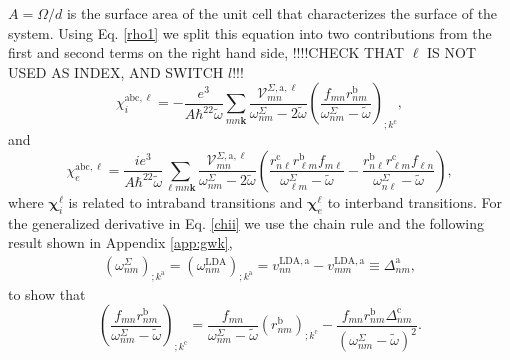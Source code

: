 $A=\Omega/d$ is the surface area of the unit cell that characterizes the surface
of the system. Using Eq. \eqref{rho1} we split this equation into two
contributions from the first and second terms on the right hand side,
{\color{red}!!!!CHECK THAT $\ell$ IS NOT USED AS INDEX, AND SWITCH $l$!!!}
\begin{equation}\label{chii}
\chi^{\mathrm{abc},\ell}_{i}
=-\frac{e^3}{A\hbar^22\tilde{\omega}}\sum_{mn\mathbf{k}}
\frac{\mathcal{V}_{mn}^{\Sigma,\mathrm{a},\ell}}{\omega^\Sigma_{nm}-2\tilde{\omega}}
\left(\frac{f_{mn}r_{nm}^{\mathrm{b}}}{\omega^\Sigma_{nm}-\tilde{\omega}}\right)_{;k^{\mathrm{c}}},
\end{equation} 
and 
\begin{equation}\label{chie}
\chi^{\mathrm{abc},\ell}_{e}
=\frac{ie^3}{A\hbar^22\tilde{\omega}}\sum_{\ell mn\mathbf{k}}
\frac{\mathcal{V}_{mn}^{\Sigma,\mathrm{a},\ell}}{\omega^\Sigma_{nm}-2\tilde{\omega}}
\left(
\frac{r_{n\ell}^{\mathrm{c}} r_{\ell m}^{\mathrm{b}} 
f_{m\ell}}{\omega^\Sigma_{\ell m}-\tilde{\omega}}
-\frac{r_{n\ell}^{\mathrm{b}} r_{\ell m}^{\mathrm{c}} 
f_{\ell n}}{\omega^\Sigma_{n \ell}-\tilde{\omega}}
\right),
\end{equation} 
where $\boldsymbol{\chi}^{\ell}_{i}$ is related to intraband transitions and
 $\boldsymbol{\chi}^{\ell}_{e}$ to interband transitions. For the generalized
 derivative in Eq. \eqref{chii} we use the chain rule and the following result
shown in Appendix \ref{app:gwk},
 \begin{align}\label{eli.13}
\left(\omega^\Sigma_{nm}\right)_{;k^{\mathrm{a}}}
=
\left(\omega^{\mathrm{LDA}}_{nm}\right)_{;k^{\mathrm{a}}}
= 
v_{nn}^{\mathrm{LDA},\mathrm{a}}-v_{mm}^{\mathrm{LDA},\mathrm{a}}\equiv\Delta_{nm}^{\mathrm{a}}
,
\end{align} 
to show that
\begin{equation}\label{gene2}
\left(\frac{f_{mn}r_{nm}^{\mathrm{b}}}{\omega^\Sigma_{nm}-\tilde{\omega}}\right)_{;k^{\mathrm{c}}}=
\frac{f_{mn}}{\omega^\Sigma_{nm}-\tilde{\omega}}\left(r_{nm}^{\mathrm{b}}\right)_{;k^{\mathrm{c}}}
-\frac{f_{mn}r_{nm}^{\mathrm{b}}\Delta_{nm}^\mathrm{c}}{(\omega^\Sigma_{nm}-\tilde{\omega})^2}.
\end{equation}

